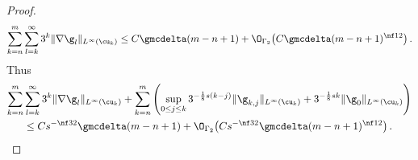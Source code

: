 \documentclass[11pt]{amsart}
\begin{document}
\begin{proof}
\begin{equation*}
	\sum_{k=n}^m
	\sum_{l=k}^\infty
	3^{k}
	\|  \nabla \g_l  \|_{L^{\infty}(\cu_k)}
	\leq
	C \gmcdelta(m-n+1) + \O_{\Gamma_2}\bigl(C \gmcdelta (m-n+1)^{\nf12}\bigr)
	\,.
\end{equation*}
Thus
\begin{multline}
	\sum_{k=n}^m
	\sum_{l=k}^\infty
	3^{k}
	\|  \nabla \g_l  \|_{L^{\infty}(\cu_k)}
	+
	\sum_{k=n}^m
	\left(
	\sup_{0\leq j \leq k}
	3^{-\frac{1}{8}s(k-j)} \| \g_{k,j} \|_{L^\infty(\cu_{k})}
	+3^{-\frac{1}{8}sk}\|\g_0\|_{L^\infty(\cu_k)}
	\right)
	\\
	\leq
	C s^{-\nf 32} \gmcdelta(m-n+1) +
	\O_{\Gamma_2}\bigl( C s^{-\nf 32}  \gmcdelta (m-n+1)^{\nf 12} \bigr)
	\,.
	\label{e.sum.the.errors.fields}
\end{multline}

\smallskip


\end{proof}
\end{document}
